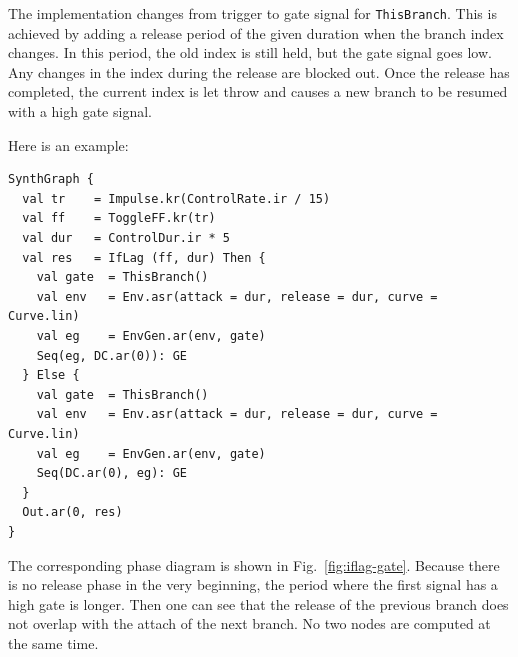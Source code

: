 \documentclass[11pt,a4paper]{article}
\newcommand{\figref}[1]{Fig.~\ref{#1}}
\begin{document}
The implementation changes from trigger to gate signal for \Verb!ThisBranch!. This is achieved by adding a release period of the given duration when the branch index changes. In this period, the old index is still held, but the gate signal goes low. Any changes in the index during the release are blocked out. Once the release has completed, the current index is let throw and causes a new branch to be resumed with a high gate signal.

Here is an example:
%
\begin{verbatim}
SynthGraph {
  val tr    = Impulse.kr(ControlRate.ir / 15)
  val ff    = ToggleFF.kr(tr)
  val dur   = ControlDur.ir * 5
  val res   = IfLag (ff, dur) Then {
    val gate  = ThisBranch()
    val env   = Env.asr(attack = dur, release = dur, curve = Curve.lin)
    val eg    = EnvGen.ar(env, gate)
    Seq(eg, DC.ar(0)): GE
  } Else {
    val gate  = ThisBranch()
    val env   = Env.asr(attack = dur, release = dur, curve = Curve.lin)
    val eg    = EnvGen.ar(env, gate)
    Seq(DC.ar(0), eg): GE
  }
  Out.ar(0, res)
}
\end{verbatim}
%
The corresponding phase diagram is shown in \figref{fig:iflag-gate}. Because there is no release phase in the very beginning, the period where the first signal has a high gate is longer. Then one can see that the release of the previous branch does not overlap with the attach of the next branch. No two nodes are computed at the same time.
\end{document}
